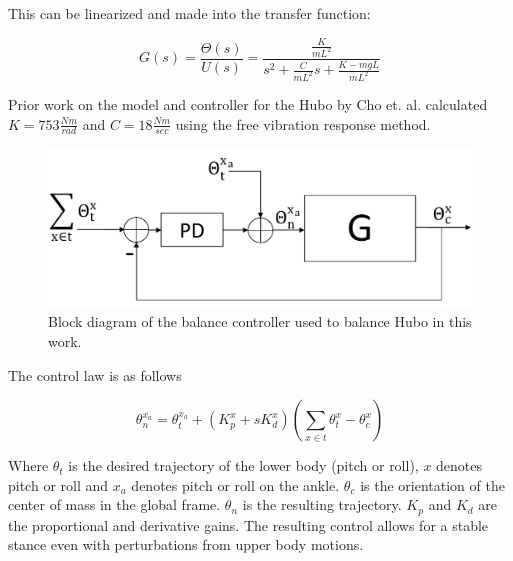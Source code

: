 This can be linearized and made into the transfer function:

\begin{equation}
G(s) = \frac{\Theta(s)}{U(s)} = \frac{\frac{K}{mL^2}}{s^2+\frac{C}{mL^2}s + \frac{K-mgL}{mL^2}}
\end{equation}

Prior work on the model and controller for the Hubo by Cho et. al. calculated $K=753\frac{Nm}{rad}$ and $C=18\frac{Nm}{sec}$ using the free vibration response method\cite{5379574}.


\begin{figure}[ht]
  \centering
\includegraphics[width=1.0\columnwidth]{./pix/blockDiagram3.pdf}
  \caption{Block diagram of the balance controller used to balance Hubo in this work.}
  \label{fig:ctrlBlockDiagram}
\end{figure}

The control law is as follows

\begin{equation}
\theta_n^{x_a} = \theta_t^{x_a} + \left(K_p^x+sK_d^x\right)\left(\sum\limits_{x \in t} \theta_{t}^x - \theta_{c}^x\right)
\end{equation}

Where $\theta_t$ is the desired trajectory of the lower body (pitch or roll), $x$ denotes pitch or roll and $x_a$ denotes pitch or roll on the ankle.  $\theta_{c}$ is the orientation of the center of mass in the global frame.  $\theta_n$ is the resulting trajectory.  $K_p$ and $K_d$ are the proportional and derivative gains.  The resulting control allows for a stable stance even with perturbations from upper body motions.
